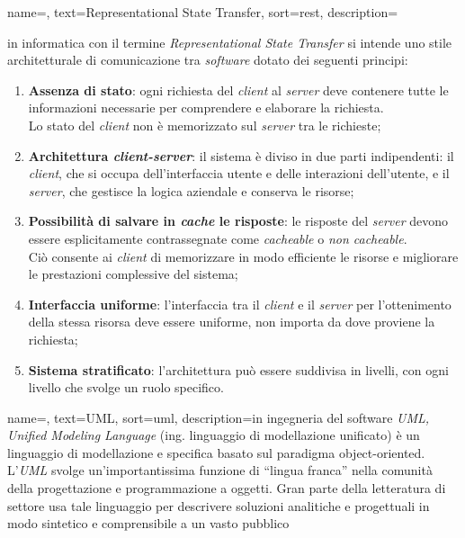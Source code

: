  {
    name=,
    text=Representational State Transfer,
    sort=rest,
    description={in informatica con il termine \emph{Representational State Transfer} si intende uno stile architetturale di comunicazione tra \textit{software} dotato dei seguenti principi: 
    \begin{enumerate}
        \item \textbf{Assenza di stato}: ogni richiesta del \textit{client} al \textit{server} deve contenere tutte le informazioni necessarie per comprendere e elaborare la richiesta. \\ Lo stato del \textit{client} non è memorizzato sul \textit{server} tra le richieste;
        \item \textbf{Architettura \textit{client-server}}: il sistema è diviso in due parti indipendenti: il \textit{client}, che si occupa dell'interfaccia utente e delle interazioni dell'utente, e il \textit{server}, che gestisce la logica aziendale e conserva le risorse;
        \item \textbf{Possibilità di salvare in \textit{cache} le risposte}: le risposte del \textit{server} devono essere esplicitamente contrassegnate come \textit{cacheable} o \textit{non cacheable}. \\ Ciò consente ai \textit{client} di memorizzare in modo efficiente le risorse e migliorare le prestazioni complessive del sistema;
        \item \textbf{Interfaccia uniforme}: l'interfaccia tra il \textit{client} e il \textit{server} per l'ottenimento della stessa risorsa deve essere uniforme, non importa da dove proviene la richiesta;
        \item \textbf{Sistema stratificato}: l'architettura può essere suddivisa in livelli, con ogni livello che svolge un ruolo specifico.
    \end{enumerate}
    \cite{site:rest-ibm}
    }
}

 {
    name=,
    text=UML,
    sort=uml,
    description={in ingegneria del software \emph{UML, Unified Modeling Language} (ing. linguaggio di modellazione unificato) è un linguaggio di modellazione e specifica basato sul paradigma object-oriented. L'\emph{UML} svolge un'importantissima funzione di ``lingua franca'' nella comunità della progettazione e programmazione a oggetti. Gran parte della letteratura di settore usa tale linguaggio per descrivere soluzioni analitiche e progettuali in modo sintetico e comprensibile a un vasto pubblico}
}

